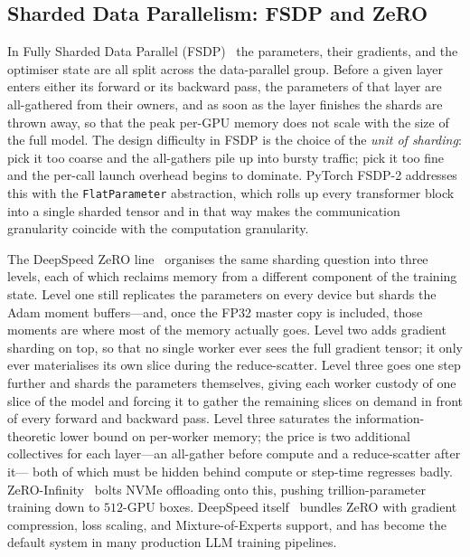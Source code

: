 \subsection{Sharded Data Parallelism: FSDP and ZeRO}\label{sec:lit_shard}
In Fully Sharded Data Parallel (FSDP)~\cite{zhao2023pytorch} the
parameters, their gradients, and the optimiser state are all split
across the data-parallel group. Before a given layer enters either
its forward or its backward pass, the parameters of that layer are
all-gathered from their owners, and as soon as the layer finishes
the shards are thrown away, so that the peak per-GPU memory does not
scale with the size of the full model. The design difficulty in
FSDP is the choice of the \emph{unit of sharding}: pick it too coarse
and the all-gathers pile up into bursty traffic; pick it too fine
and the per-call launch overhead begins to dominate. PyTorch FSDP-2
addresses this with the \texttt{FlatParameter} abstraction, which
rolls up every transformer block into a single sharded tensor and in
that way makes the communication granularity coincide with the
computation granularity.

The DeepSpeed ZeRO line~\cite{rajbhandari2019zero, rajbhandari2021zero}
organises the same sharding question into three levels, each of which
reclaims memory from a different component of the training state.
Level one still replicates the parameters on every device but shards
the Adam moment buffers---and, once the FP32 master copy is
included, those moments are where most of the memory actually goes.
Level two adds gradient sharding on top, so that no single worker
ever sees the full gradient tensor; it only ever materialises its
own slice during the reduce-scatter. Level three goes one step
further and shards the parameters themselves, giving each worker
custody of one slice of the model and forcing it to gather the
remaining slices on demand in front of every forward and backward
pass. Level three saturates the information-theoretic lower bound on
per-worker memory; the price is two additional collectives for each
layer---an all-gather before compute and a reduce-scatter after it---
both of which must be hidden behind compute or step-time regresses
badly. ZeRO-Infinity~\cite{rajbhandari2021zero} bolts NVMe offloading
onto this, pushing trillion-parameter training down to $512$-GPU
boxes. DeepSpeed itself~\cite{rasley2020deepspeed,
rajbhandari2022deepspeed} bundles ZeRO with gradient compression,
loss scaling, and Mixture-of-Experts support, and has become the
default system in many production LLM training pipelines.

